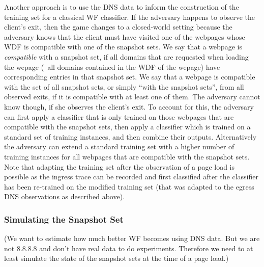 Another approach is to use the DNS data to inform the construction
of the training set for a classical WF classifier.
%
If the adversary happens to observe the client's exit, then the game
changes to a closed-world setting because the adversary knows that the
client must have visited one of the webpages whose WDF is compatible
with one of the snapshot sets.
%
We say that a webpage is \emph{compatible} with a snapshot set, if all
domains that are requested when loading the wepage (\ie~all domains
contained in the WDF of the wepage) have corresponding entries in that
snapshot set. We say that a webpage is compatible with the set of all
snapshot sets, or simply ``with the snapshot sets'', from all observed
exits, if it is compatible with at least one of them. 
%
The adversary cannot know though, if she observes the client's exit. 
%
To account for this, the adversary can first apply a classifier that is
only trained on those webpages that are compatible with the snapshot
sets, then apply a classifier which is trained on a standard set of
training instances, and then combine their outputs.
%
Alternatively the adversary can extend a standard training set with a
higher number of training instances for all webpages that are compatible
with the snapshot sets.
%
Note that adapting the training set after the observation of a page load
is possible as the ingress trace can be recorded and first classified after
the classifier has been re-trained on the modified training set (that
was adapted to the egress DNS observations as described above).


\subsubsection{Simulating the Snapshot Set}
(We want to estimate how much better WF becomes using DNS data. But we
are not 8.8.8.8 and don't have real data to do experiments. Therefore we
need to at least simulate the state of the snapshot sets at the time of a
page load.) %
